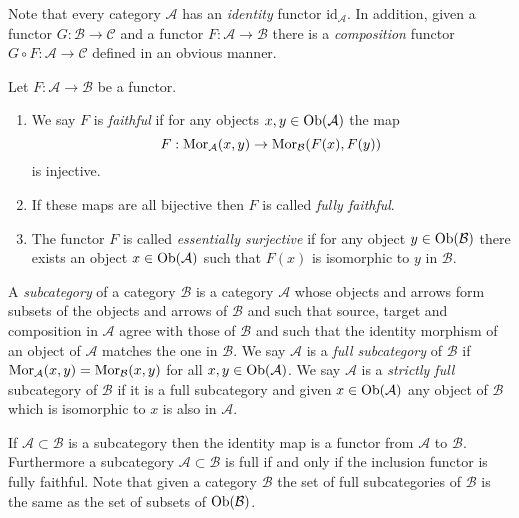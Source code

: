 \noindent
Note that every category $\mathcal{A}$ has an
{\it identity} functor $\text{id}_\mathcal{A}$.
In addition, given a functor $G : \mathcal{B} \to \mathcal{C}$
and a functor $F : \mathcal{A} \to \mathcal{B}$ there is
a {\it composition} functor $G \circ F : \mathcal{A} \to \mathcal{C}$
defined in an obvious manner.

\begin{definition}
\label{definition-faithful}
Let $F : \mathcal{A} \to \mathcal{B}$ be a functor.
\begin{enumerate}
\item We say $F$ is {\it faithful} if
for any objects $x, y \in \mathop{\mathrm{Ob}}\nolimits(\mathcal{A})$ the map
$$
F : \mathop{\mathrm{Mor}}\nolimits_\mathcal{A}(x, y) \to \mathop{\mathrm{Mor}}\nolimits_\mathcal{B}(F(x), F(y))
$$
is injective.
\item If these maps are all bijective then $F$ is called
{\it fully faithful}.
\item
The functor $F$ is called {\it essentially surjective} if for any
object $y \in \mathop{\mathrm{Ob}}\nolimits(\mathcal{B})$ there exists an object
$x \in \mathop{\mathrm{Ob}}\nolimits(\mathcal{A})$ such that $F(x)$ is isomorphic to $y$ in
$\mathcal{B}$.
\end{enumerate}
\end{definition}

\begin{definition}
\label{definition-subcategory}
A {\it subcategory} of a category $\mathcal{B}$ is a category $\mathcal{A}$
whose objects and arrows form subsets of the objects and arrows of $\mathcal{B}$
and such that source, target and composition in $\mathcal{A}$ agree with those
of $\mathcal{B}$ and such that the identity morphism of an object of
$\mathcal{A}$ matches the one in $\mathcal{B}$. We say $\mathcal{A}$ is a
{\it full subcategory} of $\mathcal{B}$ if $\mathop{\mathrm{Mor}}\nolimits_\mathcal{A}(x, y)
= \mathop{\mathrm{Mor}}\nolimits_\mathcal{B}(x, y)$ for all $x, y \in \mathop{\mathrm{Ob}}\nolimits(\mathcal{A})$.
We say $\mathcal{A}$ is a {\it strictly full} subcategory of $\mathcal{B}$
if it is a full subcategory and given $x \in \mathop{\mathrm{Ob}}\nolimits(\mathcal{A})$ any
object of $\mathcal{B}$ which is isomorphic to $x$ is also in $\mathcal{A}$.
\end{definition}

\noindent
If $\mathcal{A} \subset \mathcal{B}$ is a subcategory then the
identity map is a functor from $\mathcal{A}$ to $\mathcal{B}$.
Furthermore a subcategory $\mathcal{A} \subset \mathcal{B}$
is full if and only if the inclusion functor is fully faithful.
Note that given a category $\mathcal{B}$ the set of full subcategories
of $\mathcal{B}$ is the same as the set of subsets of
$\mathop{\mathrm{Ob}}\nolimits(\mathcal{B})$.

